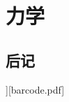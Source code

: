 \documentclass[themecolor=colorful,openany]{textbook-cn}%
\begin{document}
\partintro{\lipsum[2]}
\part{力学}



%

%

%
%
%
%
%
%
%
%
%
%
%
%
%


\backmatter

%	

\chapter{后记}

\lipsum

\makeback[\lipsum[2]][barcode.pdf]

\makespine[1.02cm]
\end{document}
